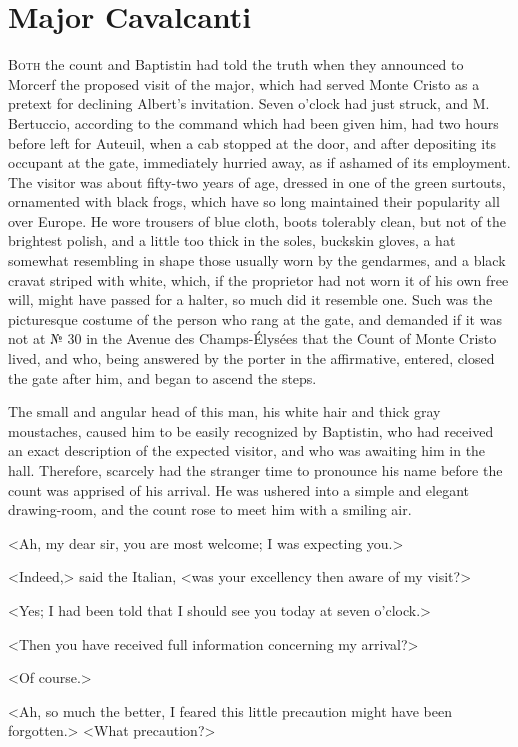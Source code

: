 \chapter{Major Cavalcanti} 

 \lettrine{B}{oth} the count and Baptistin had told the truth when they announced to Morcerf the proposed visit of the major, which had served Monte Cristo as a pretext for declining Albert's invitation. Seven o'clock had just struck, and M. Bertuccio, according to the command which had been given him, had two hours before left for Auteuil, when a cab stopped at the door, and after depositing its occupant at the gate, immediately hurried away, as if ashamed of its employment. The visitor was about fifty-two years of age, dressed in one of the green surtouts, ornamented with black frogs, which have so long maintained their popularity all over Europe. He wore trousers of blue cloth, boots tolerably clean, but not of the brightest polish, and a little too thick in the soles, buckskin gloves, a hat somewhat resembling in shape those usually worn by the gendarmes, and a black cravat striped with white, which, if the proprietor had not worn it of his own free will, might have passed for a halter, so much did it resemble one. Such was the picturesque costume of the person who rang at the gate, and demanded if it was not at № 30 in the Avenue des Champs-Élysées that the Count of Monte Cristo lived, and who, being answered by the porter in the affirmative, entered, closed the gate after him, and began to ascend the steps. 

 The small and angular head of this man, his white hair and thick gray moustaches, caused him to be easily recognized by Baptistin, who had received an exact description of the expected visitor, and who was awaiting him in the hall. Therefore, scarcely had the stranger time to pronounce his name before the count was apprised of his arrival. He was ushered into a simple and elegant drawing-room, and the count rose to meet him with a smiling air. 

 <Ah, my dear sir, you are most welcome; I was expecting you.> 

 <Indeed,> said the Italian, <was your excellency then aware of my visit?> 

 <Yes; I had been told that I should see you today at seven o'clock.> 

 <Then you have received full information concerning my arrival?> 

 <Of course.> 

 <Ah, so much the better, I feared this little precaution might have been forgotten.>  <What precaution?> 

